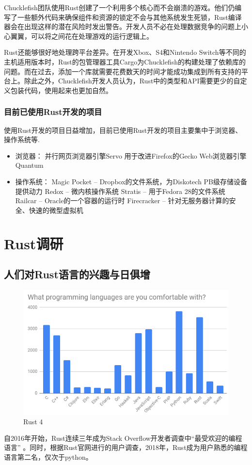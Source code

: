 \documentclass[12pt, a4paper]{article}
\begin{document}
		Chucklefish团队使用Rust创建了一个利用多个核心而不会崩溃的游戏。他们仍编写了一些额外代码来确保组件和资源的锁定不会与其他系统发生死锁，Rust编译器会在出现这样的潜在风险时发出警告。开发人员不必在处理数据竞争的问题上小心翼翼，可以将之间花在处理游戏的运行逻辑上。
		
		Rust还能够很好地处理跨平台差异。在开发Xbox、S4和Nintendo Switch等不同的主机适用版本时，Rust的包管理器工具Cargo为Chucklefish的构建处理了依赖库的问题。而在过去，添加一个库就需要花费数天的时间才能成功集成到所有支持的平台上。除此之外，Chucklefish开发人员认为，Rust中的类型和API需要更少的自定义包装代码，使用起来也更加自然。
		
		\subsubsection{目前已使用Rust开发的项目}
		使用Rust开发的项目日益增加，目前已使用Rust开发的项目主要集中于浏览器、操作系统等.   
		\begin{itemize}
			\item 浏览器：
			\subitem 并行网页浏览器引擎Servo
			\subitem 用于改进Firefox的Gecko Web浏览器引擎Quantum 
			\item 操作系统：
			\subitem Magic Pocket –  Dropbox的文件系统，为Diskotech PB级存储设备提供动力      
			\subitem Redox – 微内核操作系统   
			\subitem Stratis – 用于Fedora 28的文件系统   
			\subitem Railcar – Oracle的一个容器的运行时    
			\subitem Firecracker – 针对无服务器计算的安全、快速的微型虚拟机   
		\end{itemize}
	\section{Rust调研}
	
	\subsection{人们对Rust语言的兴趣与日俱增}
	
\begin{figure}[H]
	\centering
	\includegraphics[width=0.7\linewidth]{n4}
	\caption{Rust 4}
	\label{fig:n4}
\end{figure}
	自2016年开始，Rust连续三年成为Stack Overflow开发者调查中“最受欢迎的编程语言” 。同时，根据Rust官网进行的用户调查，2018年，Rust成为用户熟悉的编程语言第二名，仅次于python。
	
\end{document}
